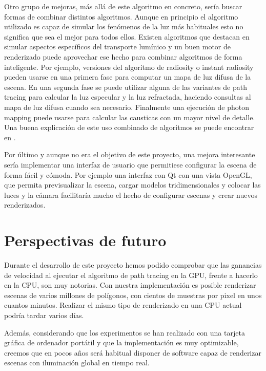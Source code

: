 \medskip

Otro grupo de mejoras, más allá de este algoritmo en concreto, sería buscar formas de combinar distintos algoritmos. Aunque en principio el algoritmo utilizado es capaz de simular los fenómenos de la luz más habituales esto no significa que sea el mejor para todos ellos. Existen algoritmos que destacan en simular aspectos específicos del transporte lumínico y un buen motor de renderizado puede aprovechar ese hecho para combinar algoritmos de forma inteligente. Por ejemplo, versiones del algoritmo de radiosity o instant radiosity pueden usarse en una primera fase para computar un mapa de luz difusa de la escena. En una segunda fase se puede utilizar alguna de las variantes de path tracing para calcular la luz especular y la luz refractada, haciendo consultas al mapa de luz difusa cuando sea necesario. Finalmente una ejecución de photon mapping puede usarse para calcular las causticas con un mayor nivel de detalle.
Una buena explicación de este uso combinado de algoritmos se puede encontrar en \cite{Hery2013}.

\medskip

Por último y aunque no era el objetivo de este proyecto, una mejora interesante sería implementar una interfaz de usuario que permitiese configurar la escena de forma fácil y cómoda. Por ejemplo una interfaz con Qt con una vista OpenGL, que permita previsualizar la escena, cargar modelos tridimensionales y colocar las luces y la cámara facilitaría mucho el hecho de configurar escenas y crear nuevos renderizados.

\clearpage

\section{Perspectivas de futuro}

Durante el desarrollo de este proyecto hemos podido comprobar que las ganancias de velocidad al ejecutar el algoritmo de path tracing en la GPU, frente a hacerlo en la CPU, son muy notorias. Con nuestra implementación es posible renderizar escenas de varios millones de polígonos, con cientos de muestras por pixel en unos cuantos minutos. Realizar el mismo tipo de renderizado en una CPU actual podría tardar varios días.

\medskip

Además, considerando que los experimentos se han realizado con una tarjeta gráfica de ordenador portátil y que la implementación es muy optimizable, creemos que en pocos años será habitual disponer de software capaz de renderizar escenas con iluminación global en tiempo real.

